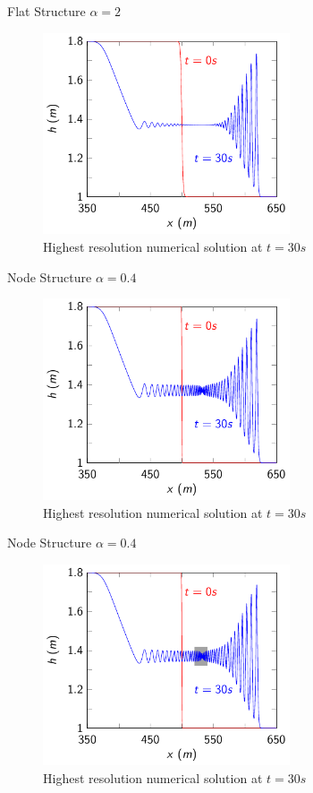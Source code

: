 \documentclass[pdf]{beamer}
\begin{document}
\begin{frame}{Flat Structure $\alpha = 2$}
	\begin{figure}
		\includegraphics[width=0.65\textwidth]{./Pictures/Results/Example/flate.pdf}
		\caption{Highest resolution numerical solution at $t=30s$}
	\end{figure}
\end{frame}
\begin{frame}{Node Structure $\alpha = 0.4$}
	\begin{figure}
		\includegraphics[width=0.65\textwidth]{./Pictures/Results/Example/node.pdf}
		\caption{Highest resolution numerical solution at $t=30s$}
	\end{figure}
\end{frame}

\begin{frame}{Node Structure $\alpha = 0.4$}
	\begin{figure}
		\includegraphics[width=0.65\textwidth]{./Pictures/Results/Example/node1.pdf}
		\caption{Highest resolution numerical solution at $t=30s$}
	\end{figure}
\end{frame}
\end{document}
